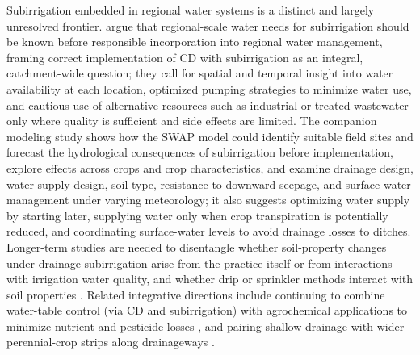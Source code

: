 Subirrigation embedded in regional water systems is a distinct and largely unresolved frontier. \textcite{deWit2022} argue that regional-scale water needs for subirrigation should be known before responsible incorporation into regional water management, framing correct implementation of CD with subirrigation as an integral, catchment-wide question; they call for spatial and temporal insight into water availability at each location, optimized pumping strategies to minimize water use, and cautious use of alternative resources such as industrial or treated wastewater only where quality is sufficient and side effects are limited. The companion modeling study \parencite{deWit2024} shows how the SWAP model could identify suitable field sites and forecast the hydrological consequences of subirrigation before implementation, explore effects across crops and crop characteristics, and examine drainage design, water-supply design, soil type, resistance to downward seepage, and surface-water management under varying meteorology; it also suggests optimizing water supply by starting later, supplying water only when crop transpiration is potentially reduced, and coordinating surface-water levels to avoid drainage losses to ditches. Longer-term studies are needed to disentangle whether soil-property changes under drainage-subirrigation arise from the practice itself or from interactions with irrigation water quality, and whether drip or sprinkler methods interact with soil properties \parencite{Kaur2023}. Related integrative directions include continuing to combine water-table control (via CD and subirrigation) with agrochemical applications to minimize nutrient and pesticide losses \parencite{BENGTSON1995}, and pairing shallow drainage with wider perennial-crop strips along drainageways \parencite{Schilling2007}.

